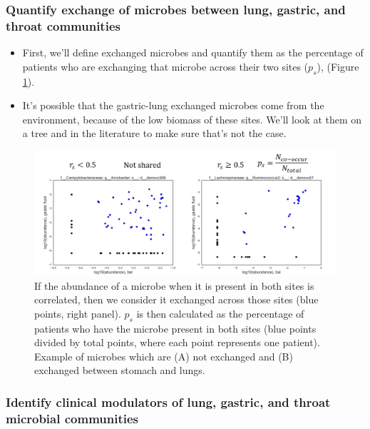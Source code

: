 \documentclass[12pt]{article}
\begin{document}
\subsubsection{Quantify exchange of microbes between lung, gastric, and throat communities} \label{sec:exchange}

\begin{itemize}
\item First, we'll define exchanged microbes and quantify them as the 
percentage of patients who are exchanging that microbe across their two sites ($p_s$), (Figure \ref{fig:sharedness_defn}).
\item It's possible that the gastric-lung exchanged microbes come from the environment, because of the low biomass of these sites. We'll look at them on a tree and in the literature to make sure that's not the case.
\end{itemize}

\begin{figure}[H]
\begin{center}
    \includegraphics[scale=0.6]{sharedness_definition}
    \caption{If the abundance of a microbe when it is 
    present in both sites is correlated, then we consider it exchanged 
    across those sites (blue points, right panel). $p_s$ is then calculated as the 
    percentage of patients who have the microbe present in both sites (blue 
    points divided by total points, where each point represents one patient). 
    Example of microbes which are (A) not exchanged and (B) exchanged between stomach and lungs.}\label{fig:sharedness_defn}
\end{center}
\end{figure}

\subsubsection{Identify clinical modulators of lung, gastric, and throat microbial communities}
\end{document}
